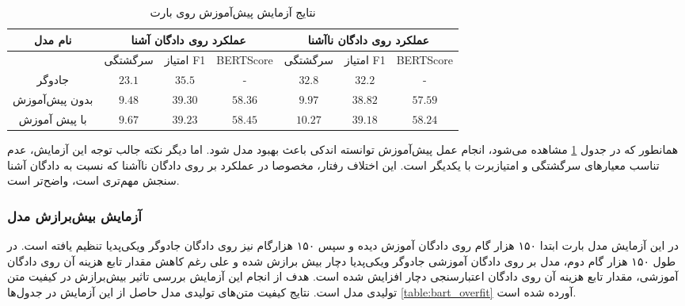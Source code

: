 \begin{table}[htb]
	\caption{نتایج آزمایش پیش‌آموزش روی بارت}
	\label{table:bart_pretrain}
	\begin{tabular}{|c|c|c|c|c|c|c|}
		\hline
		نام مدل        & \multicolumn{3}{c|}{عملکرد روی دادگان آشنا} & \multicolumn{3}{c|}{عملکرد روی دادگان نا‌آشنا} \\ \hline
		& سرگشتگی     & امتیاز F1     & BERTScore     & سرگشتگی      & امتیاز F1      & BERTScore      \\ \hline
		جادوگر         & $23.1$      & $35.5$        & -             & $32.8$       & $32.2$         & -              \\ \hline
		بدون پیش‌آموزش & $9.48$      & $39.30$       & $58.36$       & $9.97$       & $38.82$        & $57.59$        \\ \hline
		با پیش آموزش   & $9.67$      & $39.23$       & $58.45$       & $10.27$      & $39.18$        & $58.24$        \\ \hline
	\end{tabular}
\end{table}

همانطور که در جدول 
\ref{table:bart_pretrain}
مشاهده می‌شود، انجام عمل پیش‌آموزش توانسته اندکی باعث بهبود مدل شود. اما دیگر نکته جالب توجه این آزمایش، عدم تناسب معیارهای سرگشتگی و امتیازبرت با یکدیگر است. این اختلاف رفتار،‌ مخصوصا در عملکرد بر روی دادگان نا‌آشنا که نسبت به دادگان آشنا سنجش مهم‌تری است، واضح‌تر است.

\subsubsection{آزمایش بیش‌برازش مدل}
در این آزمایش مدل بارت ابتدا ۱۵۰ هزار گام روی دادگان
آموزش دیده و سپس ۱۵۰ هزارگام نیز روی دادگان جادوگر ویکی‌پدیا تنظیم یافته است. در طول ۱۵۰ هزار گام دوم، مدل بر روی دادگان آموزشی جادوگر ویکی‌پدیا دچار بیش برازش شده و علی رغم کاهش مقدار تابع هزینه آن روی دادگان آموزشی، مقدار تابع هزینه آن روی دادگان اعتبارسنجی دچار افزایش شده است. هدف از انجام این آزمایش بررسی تاثیر بیش‌برازش در کیفیت متن تولیدی مدل است. نتایج کیفیت متن‌های تولیدی مدل حاصل از این آزمایش در جدول‌ها
\ref{table:bart_overfit}
 آورده شده است. 

